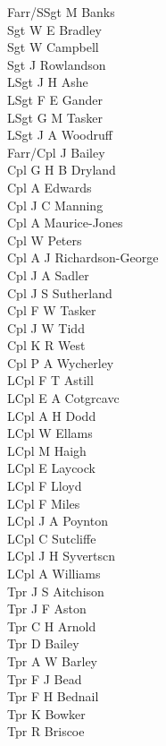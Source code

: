 \begin{multicols}{3}
  \small
  \noindent
  Farr/SSgt M Banks \\
  Sgt W E Bradley \\
  Sgt W Campbell \\
  Sgt J Rowlandson \\
  LSgt J H Ashe \\
  LSgt F E Gander \\
  LSgt G M Tasker \\
  LSgt J A Woodruff \\
  Farr/Cpl J Bailey \\
  Cpl G H B Dryland \\
  Cpl A Edwards \\
  Cpl J C Manning \\
  Cpl A Maurice-Jones \\
  Cpl W Peters \\
  Cpl A J Richardson-George \\
  Cpl J A Sadler \\
  Cpl J S Sutherland \\
  Cpl F W Tasker \\
  Cpl J W Tidd \\
  Cpl K R West \\
  Cpl P A Wycherley \\
  LCpl F T Astill \\
  LCpl E A Cotgrcavc \\
  LCpl A H Dodd \\
  LCpl W Ellams \\
  LCpl M Haigh \\
  LCpl E Laycock \\
  LCpl F Lloyd \\
  LCpl F Miles \\
  LCpl J A Poynton \\
  LCpl C Sutcliffe \\
  LCpl J H Syvertscn \\
  LCpl A Williams \\
  Tpr J S Aitchison \\
  Tpr J F Aston \\
  Tpr C H Arnold \\
  Tpr D Bailey \\
  Tpr A W Barley \\
  Tpr F J Bead \\
  Tpr F H Bednail \\
  Tpr K Bowker \\
  Tpr R Briscoe \\

\end{multicols}
